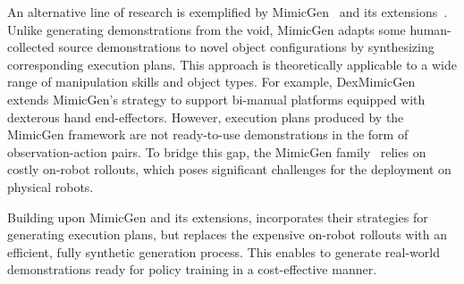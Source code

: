 


An alternative line of research is exemplified by MimicGen~\cite{mandlekar2023mimicgen} and its extensions~\cite{hoque2024intervengen,garrett2024skillmimicgen,jiang2024dexmimicgen}. Unlike generating demonstrations from the void, MimicGen adapts some human-collected source demonstrations to novel object configurations by synthesizing corresponding execution plans. This approach is theoretically applicable to a wide range of manipulation skills and object types. For example, DexMimicGen~\cite{jiang2024dexmimicgen} extends MimicGen’s strategy to support bi-manual platforms equipped with dexterous hand end-effectors.
However, execution plans produced by the MimicGen framework are not ready-to-use demonstrations in the form of observation-action pairs. To bridge this gap, the MimicGen family~\cite{mandlekar2023mimicgen,hoque2024intervengen,garrett2024skillmimicgen,jiang2024dexmimicgen} relies on costly on-robot rollouts, which poses significant challenges for the deployment on physical robots.

Building upon MimicGen and its extensions, \method incorporates their strategies for generating execution plans, but replaces the expensive on-robot rollouts with an efficient, fully synthetic generation process. This enables \method to generate real-world demonstrations ready for policy training in a cost-effective manner.